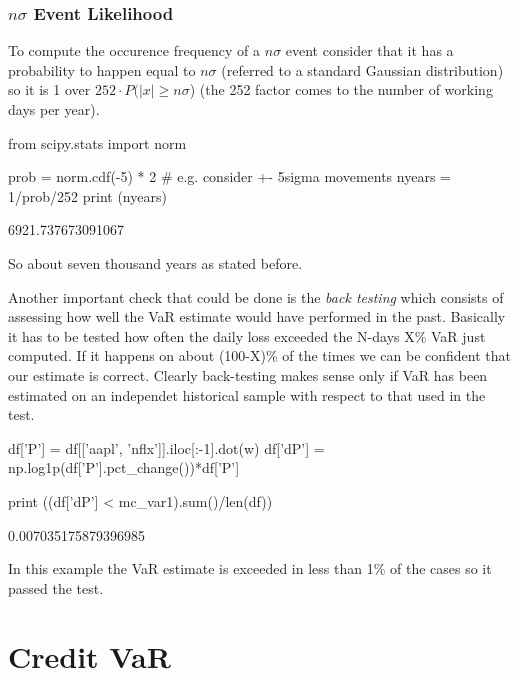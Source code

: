\begin{attention}
\subsubsection{$n\sigma$ Event Likelihood}
To compute the occurence frequency of a $n\sigma$ event consider that it has a probability to happen equal to $n\sigma$ (referred to a standard Gaussian distribution) so it is 1 over $252\cdot P(|x| \ge n\sigma$) (the 252 factor comes to the number of working days per year).

\begin{attpython}
from scipy.stats import norm

prob = norm.cdf(-5) * 2 # e.g. consider +- 5sigma movements
nyears = 1/prob/252
print (nyears)
\end{attpython}
\begin{ioutput}
6921.737673091067
\end{ioutput}
\noindent
So about seven thousand years as stated before.
\end{attention}

Another important check that could be done is the \emph{back testing} which consists of assessing how well the VaR estimate would have performed in the past. Basically it has to be tested how often the daily loss exceeded the N-days X\% VaR just computed. If it happens on about (100-X)\% of the times we can be confident that our estimate is correct. Clearly back-testing makes sense only if VaR has been estimated on an independet historical sample with respect to that used in the test.

\begin{ipython}
	
df['P'] = df[['aapl', 'nflx']].iloc[:-1].dot(w)
df['dP'] = np.log1p(df['P'].pct_change())*df['P']

print ((df['dP'] < mc_var1).sum()/len(df))
\end{ipython}
\begin{ioutput}
0.007035175879396985
\end{ioutput}

In this example the VaR estimate is exceeded in less than 1\% of the cases so it passed the test.

\section{Credit VaR}
\label{credit-var-cr-var}


